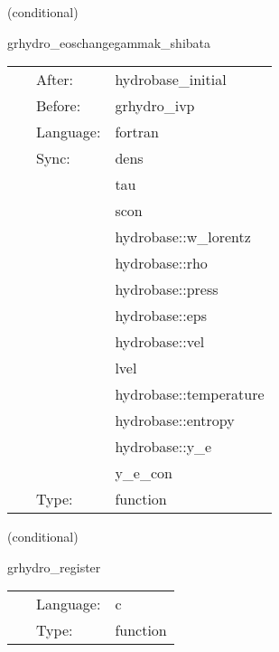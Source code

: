 \vspace{5mm}

   (conditional) 

\hspace{5mm} grhydro\_eoschangegammak\_shibata 

\hspace{5mm}{\it reset the hydro variables if the eos gamma and k change between id and evolution } 


\hspace{5mm}

 \begin{tabular*}{160mm}{cll} 
~ & After:  & hydrobase\_initial \\ 
~ & Before:  & grhydro\_ivp \\ 
~ & Language:  & fortran \\ 
~ & Sync:  & dens \\ 
~& ~ &tau\\ 
~& ~ &scon\\ 
~& ~ &hydrobase::w\_lorentz\\ 
~& ~ &hydrobase::rho\\ 
~& ~ &hydrobase::press\\ 
~& ~ &hydrobase::eps\\ 
~& ~ &hydrobase::vel\\ 
~& ~ &lvel\\ 
~& ~ &hydrobase::temperature\\ 
~& ~ &hydrobase::entropy\\ 
~& ~ &hydrobase::y\_e\\ 
~& ~ &y\_e\_con\\ 
~ & Type:  & function \\ 
\end{tabular*} 


\vspace{5mm}

   (conditional) 

\hspace{5mm} grhydro\_register 

\hspace{5mm}{\it register variables for mol } 


\hspace{5mm}

 \begin{tabular*}{160mm}{cll} 
~ & Language:  & c \\ 
~ & Type:  & function \\ 
\end{tabular*} 


